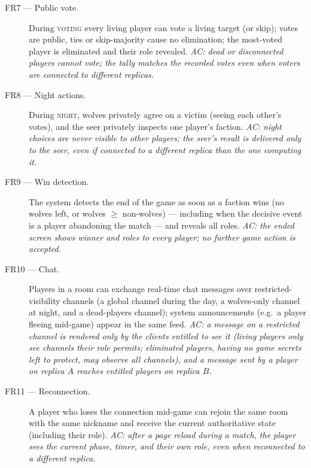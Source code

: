 \documentclass{scrartcl}
\begin{document}
\begin{description}
      \item[FR7 --- Public vote.] During \textsc{voting} every living player can
            vote a living target (or skip); votes are public, ties or skip-majority cause
            no elimination; the most-voted player is eliminated and their role revealed.
            \emph{AC: dead or disconnected players cannot vote; the tally matches the
                  recorded votes even when voters are connected to different replicas.}

      \item[FR8 --- Night actions.] During \textsc{night}, wolves privately agree on
            a victim (seeing each other's votes), and the seer privately inspects one
            player's faction. \emph{AC: night choices are never visible to other players;
                  the seer's result is delivered only to the seer, even if connected to a
                  different replica than the one computing it.}

      \item[FR9 --- Win detection.] The system detects the end of the game as soon
            as a faction wins (no wolves left, or wolves $\geq$ non-wolves) --- including
            when the decisive event is a player abandoning the match --- and reveals all
            roles. \emph{AC: the ended screen shows winner and roles to every player; no
                  further game action is accepted.}

      \item[FR10 --- Chat.] Players in a room can exchange real-time chat messages
            over restricted-visibility channels (a global channel during the day, a
            wolves-only channel at night, and a dead-players channel); system
            announcements (e.g.\ a player fleeing mid-game) appear in the same feed.
            \emph{AC: a message on a restricted channel is rendered only by the clients 
            entitled to see it (living players only see channels their role permits; 
            eliminated players, having no game secrets left to protect, may observe all 
            channels), and a message sent by a player on replica $A$ reaches
                  entitled players on replica $B$.}

      \item[FR11 --- Reconnection.] A player who loses the connection mid-game can
            rejoin the same room with the same nickname and receive the current
            authoritative state (including their role). \emph{AC: after a page reload
                  during a match, the player sees the current phase, timer, and their own role,
                  even when reconnected to a different replica.}


\end{description}
\end{document}
